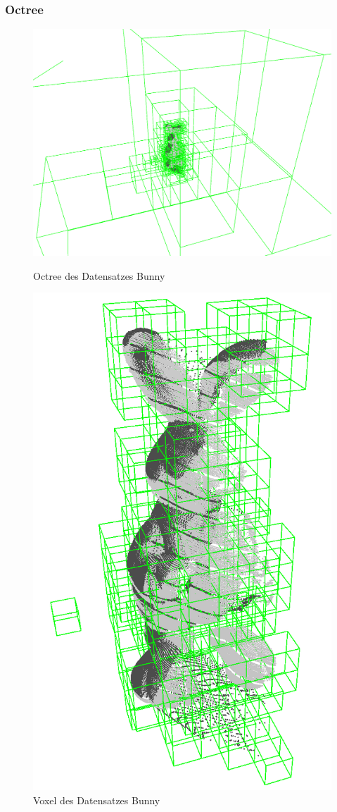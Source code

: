 \documentclass[presentation]{beamer}
\begin{document}
\begin{frame}
\frametitle{Octree}

\begin{figure} 
	\centering
	\begin{minipage}{.45\textwidth} 
		\centering
		\includegraphics[width=1\linewidth]{figures/bunny/bunny_octree.png}
		\caption{Octree des Datensatzes Bunny}
		\label{fig:bunnyOctree}
	\end{minipage}
	\centering
	\begin{minipage}{.45\textwidth} 
		\centering
		\includegraphics[width=0.5\linewidth]{figures/bunny/bunny_voxel.png}
		\caption{Voxel des Datensatzes Bunny}
		\label{fig:bunnyVoxels}
	\end{minipage}
	\label{fig:octree}
\end{figure}


\end{frame}
\end{document}
